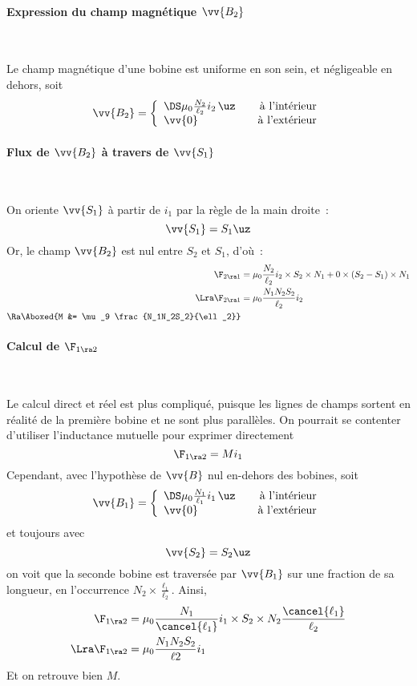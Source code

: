 \documentclass[../main/main.tex]{subfiles}
\begin{document}
\paragraph*{Expression du champ magnétique $\vv{B_2}$}~
\begin{hide}
  Le champ magnétique d'une bobine est uniforme en son sein, et négligeable en
  dehors, soit
  \[
    \vv{B_2} =
    \left\{
    \begin{array}{lr}
      \DS
      \mu_0 \frac{N_2}{\ell_2}i_2\,\uz \quad & \text{à l'intérieur}
      \\
      \vv{0} \quad & \text{à l'extérieur}
    \end{array}
    \right.
  \]
\end{hide}

\paragraph*{Flux de $\vv{B_2}$ à travers de $\vv{S_1}$}~
\begin{hide}
  On oriente $\vv{S_1}$ à partir de $i_1$ par la règle de la main droite~:
  \[
    \vv{S_1} = S_1\uz
  \]
  Or, le champ $\vv{B_2}$ est nul entre $S_2$ et $S_1$, d'où~:
  \begin{align*}
    \F_{2\ra 1} &= \mu_0 \frac{N_2}{\ell_2}i_2 \times S_2\times N_1
    + 0\times (S_2-S_1) \times N_1
    \\\Lra 
    \F_{2\ra 1} &= \mu_0 \frac{N_1N_2S_2}{\ell_2} i_2
    \\\Ra 
    \Aboxed{M &= \mu_9 \frac{N_1N_2S_2}{\ell _2}}
  \end{align*}
\end{hide}

\paragraph*{Calcul de $\F_{1\ra 2}$}~
\begin{hide}
  Le calcul direct et réel est plus compliqué, puisque les lignes de champs
  sortent en réalité de la première bobine et ne sont plus parallèles. On
  pourrait se contenter d'utiliser l'inductance mutuelle pour exprimer
  directement
  \[
    \F_{1\ra 2} = Mi_1
  \]
  Cependant, avec l'hypothèse de $\vv{B}$ nul en-dehors des bobines, soit
  \[
    \vv{B_1} =
    \left\{
    \begin{array}{lr}
      \DS
      \mu_0 \frac{N_1}{\ell_1}i_1\,\uz \quad & \text{à l'intérieur}
      \\
      \vv{0} \quad & \text{à l'extérieur}
    \end{array}
    \right.
  \]
  et toujours avec
  \[
    \vv{S_2} = S_2\uz 
  \]
  on voit que la seconde bobine est traversée par $\vv{B_1}$ sur une fraction de
  sa longueur, en l'occurrence $N_2\times \frac{\ell _1}{\ell _2}$. Ainsi,
  \begin{align*}
    \F_{1\ra 2} &= \mu_0 \frac{N_1}{\cancel{\ell _1}}i_1\times
      S_2 \times N_2\frac{\cancel{\ell _1}}{\ell _2}
    \\\Lra 
    \F_{1\ra 2} &= \mu_0 \frac{N_1N_2S_2}{\ell 2}i_1
  \end{align*}
  Et on retrouve bien $M$.
\end{hide}
\end{document}
